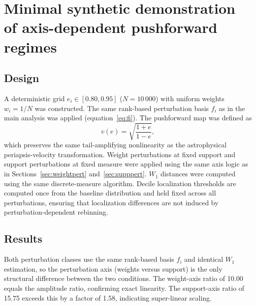\documentclass[a4paper,fleqn,usenatbib]{mnras}
\begin{document}
\section{Minimal synthetic demonstration of axis-dependent pushforward regimes}
\label{sec:appendix_a}

\subsection{Design}

A deterministic grid $e_i \in [0.80, 0.95]$ ($N = 10\,000$) with uniform
weights $w_i = 1/N$ was constructed. The same rank-based perturbation basis
$f_i$ as in the main analysis was applied (equation~\ref{eq:fi}). The
pushforward map was defined as
\begin{equation}
  v(e) = \sqrt{\frac{1+e}{1-e}},
\end{equation}
which preserves the same tail-amplifying nonlinearity as the astrophysical
periapsis-velocity transformation. Weight perturbations at fixed support and
support perturbations at fixed measure were applied using the same axis logic as
in Sections~\ref{sec:weightpert} and~\ref{sec:supppert}. $W_1$ distances were
computed using the same discrete-measure algorithm. Decile localization
thresholds are computed once from the baseline distribution and held fixed
across all perturbations, ensuring that localization differences are not induced
by perturbation-dependent rebinning.

\subsection{Results}

\begin{table}
  \centering
  \caption{Synthetic regime contrast.}
  \label{tab:synthetic}
\end{table}

Both perturbation classes use the same rank-based basis $f_i$ and identical
$W_1$ estimation, so the perturbation axis (weights versus support) is the only
structural difference between the two conditions. The weight-axis ratio of 10.00
equals the amplitude ratio, confirming exact linearity. The support-axis ratio
of 15.75 exceeds this by a factor of 1.58, indicating super-linear scaling.
\end{document}
